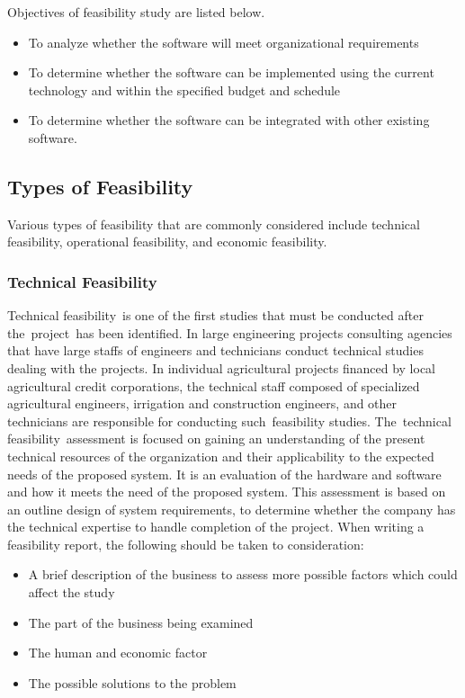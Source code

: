 Objectives of feasibility study are listed below.
\begin{itemize}
	\item To analyze whether the software will meet organizational requirements
	\item To determine whether the software can be implemented using the current technology and within the specified budget and schedule
	\item To determine whether the software can be integrated with other existing software.
\end{itemize}

\subsection{Types of Feasibility}
Various types of feasibility that are commonly considered include technical feasibility, operational feasibility, and economic feasibility.

\subsubsection{Technical Feasibility}
Technical feasibility is one of the first studies that must be conducted after the project has been identified. In large engineering projects consulting agencies that have large staffs of engineers and technicians conduct technical studies dealing with the projects. In individual agricultural projects financed by local agricultural credit corporations, the technical staff composed of specialized agricultural engineers, irrigation and construction engineers, and other technicians are responsible for conducting such feasibility studies. The technical feasibility assessment is focused on gaining an understanding of the present technical resources of the organization and their applicability to the expected needs of the proposed system. It is an evaluation of the hardware and software and how it meets the need of the proposed system. This assessment is based on an outline design of system requirements, to determine whether the company has the technical expertise to handle completion of the project. When writing a feasibility report, the following should be taken to consideration:
\begin{itemize}
	\item A brief description of the business to assess more possible factors which could affect the study
	\item The part of the business being examined
	\item The human and economic factor
	\item The possible solutions to the problem
\end{itemize}

